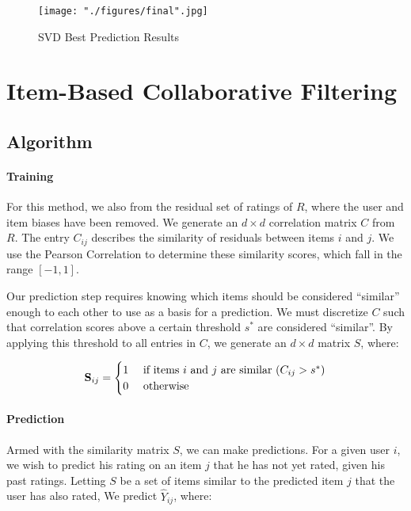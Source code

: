 \documentclass[12pt]{article}
\begin{document}
\begin{figure}[!ht]
\begin{center}
\caption{SVD Best Prediction Results}
    \texttt{[image: "./figures/final".jpg]}
\end{center}
\end{figure}

\section{Item-Based Collaborative Filtering}

\subsection*{Algorithm}
\paragraph{Training} For this method, we also from the residual set of ratings of $R$, where the user and item biases have been removed. We generate an $d \times d$ correlation matrix $C$ from $R$. The entry ${C}_{ij}$ describes the similarity of residuals between items $i$ and $j$. We use the Pearson Correlation to determine these similarity scores, which fall in the range $[-1, 1]$.


Our prediction step requires knowing which items should be considered ``similar'' enough to each other to use as a basis for a prediction. We must discretize ${C}$ such that correlation scores above a certain threshold $s^*$ are considered ``similar''.\textsuperscript{\cite{sarwar}} By applying this threshold to all entries in ${C}$, we generate an $d \times d$ matrix ${S}$, where:

$$
\mathbf{S}_{ij} =
\begin{cases}
    \hfill 1    \hfill & \text{ if items $i$ and $j$ are similar ($C_{ij} > s^*$)} \\
    \hfill 0    \hfill & \text{ otherwise} \\
\end{cases}
$$

\paragraph{Prediction} Armed with the similarity matrix ${S}$, we can make predictions. For a given user $i$, we wish to predict his rating on an item $j$ that he has not yet rated, given his past ratings. Letting $S$ be a set of items similar to the predicted item $j$ that the user has also rated, We predict $\hat Y_{ij}$, where:
\end{document}
